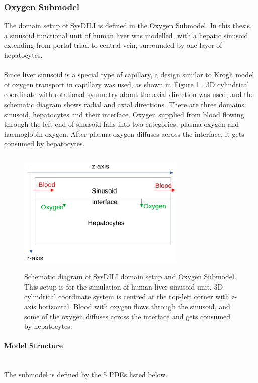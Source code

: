 \documentclass[12pt]{article}
\newcommand{\myparagraph}[1]{\paragraph{#1}\mbox{}\\}
\begin{document}
\subsubsection{Oxygen Submodel}
The domain setup of SysDILI is defined in the Oxygen Submodel. In this thesis, a sinusoid functional unit of human liver was modelled, with a hepatic sinusoid extending from portal triad to central vein, surrounded by one layer of hepatocytes.\\\\Since liver sinusoid is a special type of capillary, a design similar to Krogh model of oxygen transport in capillary was used, as shown in Figure \ref{fig:oxy} \cite{goldmanTheoreticalModelsMicrovascular2008}. 3D cylindrical coordinate with rotational symmetry about the axial direction was used, and the schematic diagram shows radial and axial directions. There are three domains: sinusoid, hepatocytes and their interface. Oxygen supplied from blood flowing through the left end of sinusoid falls into two categories, plasma oxygen and haemoglobin oxygen. After plasma oxygen diffuses across the interface, it gets consumed by hepatocytes. 
\begin{figure}[h!]
\centering
\includegraphics[width = 8cm, height = 6cm]{oxy_sketch.png}
\caption{Schematic diagram of SysDILI domain setup and Oxygen Submodel. This setup is for the simulation of human liver sinusoid unit. 3D cylindrical coordinate system is centred at the top-left corner with z-axis horizontal. Blood with oxygen flows through the sinusoid, and some of the oxygen diffuses across the interface and gets consumed by hepatocytes.}
\label{fig:oxy}
\end{figure}
\myparagraph{Model Structure}
The submodel is defined by the 5 PDEs listed below.
\end{document}
